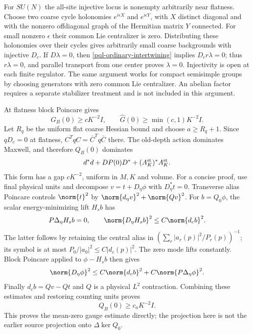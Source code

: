 For $SU(N)$ the all-site injective locus is nonempty arbitrarily near
flatness. Choose two coarse cycle holonomies $e^{i\epsilon X}$ and
$e^{i\epsilon Y}$, with $X$ distinct diagonal and with the nonzero
offdiagonal graph of the Hermitian matrix $Y$ connected. For small
nonzero $\epsilon$ their common Lie centralizer is zero. Distributing
these holonomies over their cycles gives arbitrarily small coarse
backgrounds with injective $D_c$. If $D\lambda=0$, then
\eqref{pql-ordinary-intertwining} implies $D_cr\lambda=0$;
thus $r\lambda=0$, and parallel transport from one center proves
$\lambda=0$. Injectivity is open at each finite regulator. The same
argument works for compact semisimple groups by choosing generators
with zero common Lie centralizer. An abelian factor requires a separate
stabilizer treatment and is not included in this argument.

At flatness block Poincare gives
\begin{equation}
 G_B(0)\ge cK^{-2}I,\qquad
 \widehat G(0)\ge\min(c,1)K^{-2}I.
 \label{pql-scalar-gap}
\end{equation}
Let $R_q$ be the uniform flat coarse Hessian bound and choose
$a\ge R_q+1$. Since $qD_c=0$ at flatness,
$C^TqC=\bar C^Tq\bar C$ there. The old-depth action dominates
Maxwell, and therefore $Q_B(0)$ dominates
\begin{equation}
 d^*d+D P(0)D^*+(A_K^{\rm st})^*A_K^{\rm st}.
 \label{pql-dominated-form}
\end{equation}
This form has a gap $cK^{-2}$, uniform in $M,K$ and volume.
For a concise proof, use final physical units and decompose
$v=t+D_\eta\phi$ with $D_\eta^*t=0$. Transverse alias Poincare
controls $\norm{t}^2$ by $\norm{d_\eta v}^2+\norm{Qv}^2$.
For $b=Q_0\phi$, the scalar energy-minimizing lift $H_sb$ has
\[
 P\Delta_\eta H_sb=0,\qquad
 \norm{D_\eta H_sb}^2\le C\norm{d_cb}^2.
\]
The latter follows by retaining the central alias in
$(\sum_r|a_r(p)|^2/P_r(p))^{-1}$; its symbol is at most
$P_0/|a_0|^2\le C|d_c(p)|^2$. The zero mode lifts constantly.
Block Poincare applied to $\phi-H_sb$ then gives
\[
 \norm{D_\eta\phi}^2
 \le C\norm{d_cb}^2+C\norm{P\Delta_\eta\phi}^2.
\]
Finally $d_cb=Qv-Qt$ and $Q$ is a physical $L^2$ contraction.
Combining these estimates and restoring counting units proves
\begin{equation}
 Q_B(0)\ge c_aK^{-2}I.
 \label{pql-vector-gap}
\end{equation}
This proves the mean-zero gauge estimate directly; the projection
here is not the earlier source projection onto $\Delta\ker Q_0$.

